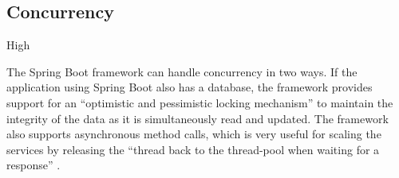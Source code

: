\subsection*{Concurrency}

\ranking High

The Spring Boot framework can handle concurrency in two ways. If the application using Spring Boot also has a database, the framework provides support for an \enquote{optimistic and pessimistic locking mechanism} \cite{springBootDataBaseConcurrency} to maintain the integrity of the data as it is simultaneously read and updated. The framework also supports asynchronous method calls, which is very useful for scaling the services by releasing the \enquote{thread back to the thread-pool when waiting for a response} \cite{springBootConcurrency}.